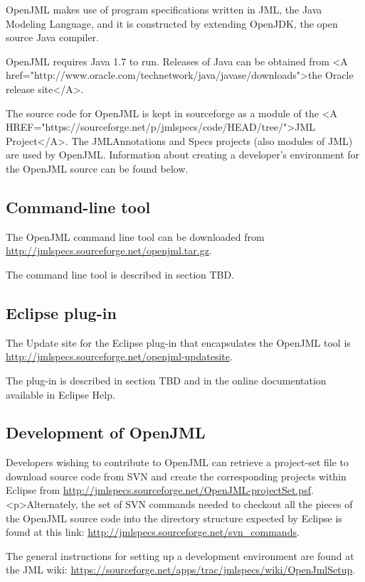 \documentclass{report}%
\begin{document}
OpenJML makes use of program specifications written in JML, the Java Modeling Language, and
it is constructed by extending OpenJDK, the open source Java compiler.

OpenJML requires Java 1.7 to run.
Releases of Java can be obtained from 
<A href="http://www.oracle.com/technetwork/java/javase/downloads">the Oracle release site</A>.

The source code for OpenJML is kept in sourceforge as a module of the 
<A HREF="https://sourceforge.net/p/jmlspecs/code/HEAD/tree/">JML Project</A>.
The JMLAnnotations and Specs projects (also modules of JML) are used by OpenJML.
Information about creating a developer's environment for the OpenJML source
can be found below.
 
\subsection{Command-line tool}

The OpenJML command line tool can be downloaded from
\url{http://jmlspecs.sourceforge.net/openjml.tar.gz}.

The command line tool is described in section TBD.

\subsection{Eclipse plug-in}

The Update site for the Eclipse plug-in that encapsulates the OpenJML tool
is \url{http://jmlspecs.sourceforge.net/openjml-updatesite}.

The plug-in is described in section TBD and in the online documentation available in Eclipse Help.


\subsection{Development of OpenJML}

Developers wishing to contribute to OpenJML can retrieve a project-set file to download source code from SVN and create the corresponding projects within Eclipse from 
\url{http://jmlspecs.sourceforge.net/OpenJML-projectSet.psf}.
<p>Alternately, the set of SVN commands needed to checkout all the pieces of the
OpenJML source code into the directory structure expected by Eclipse is found at this link: 
\url{http://jmlspecs.sourceforge.net/svn_commands}.

The general instructions for setting up a development environment are found at the JML wiki: \url{https://sourceforge.net/apps/trac/jmlspecs/wiki/OpenJmlSetup}.
\end{document}
